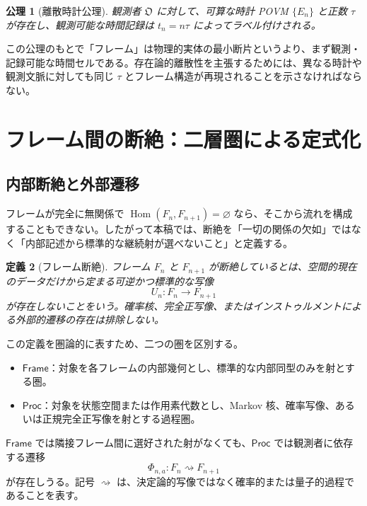 \documentclass[a4paper,11pt]{ltjsarticle}
\newtheorem{definition}{定義}[section]
\newtheorem{axiom}[definition]{公理}
\theoremstyle{remark}
\newcommand{\Hom}{\operatorname{Hom}}
\newcommand{\Frame}{\mathsf{Frame}}
\newcommand{\Proc}{\mathsf{Proc}}
\begin{document}
\begin{axiom}[離散時計公理]
観測者 $\mathfrak O$ に対して、可算な時計 POVM $\{E_n\}$ と正数 $\tau$ が存在し、観測可能な時間記録は $t_n=n\tau$ によってラベル付けされる。
\end{axiom}

この公理のもとで「フレーム」は物理的実体の最小断片というより、まず観測・記録可能な時間セルである。存在論的離散性を主張するためには、異なる時計や観測文脈に対しても同じ $\tau$ とフレーム構造が再現されることを示さなければならない。

\section{フレーム間の断絶：二層圏による定式化}

\subsection{内部断絶と外部遷移}
フレームが完全に無関係で $\Hom(F_n,F_{n+1})=\varnothing$ なら、そこから流れを構成することもできない。したがって本稿では、断絶を「一切の関係の欠如」ではなく「内部記述から標準的な継続射が選べないこと」と定義する。

\begin{definition}[フレーム断絶]
フレーム $F_n$ と $F_{n+1}$ が断絶しているとは、空間的現在のデータだけから定まる可逆かつ標準的な写像
\begin{equation}
 U_n:F_n\longrightarrow F_{n+1}
\end{equation}
が存在しないことをいう。確率核、完全正写像、またはインストゥルメントによる外部的遷移の存在は排除しない。
\end{definition}

この定義を圏論的に表すため、二つの圏を区別する。
\begin{itemize}
  \item $\Frame$：対象を各フレームの内部幾何とし、標準的な内部同型のみを射とする圏。
  \item $\Proc$：対象を状態空間または作用素代数とし、Markov 核、確率写像、あるいは正規完全正写像を射とする過程圏。
\end{itemize}
$\Frame$ では隣接フレーム間に選好された射がなくても、$\Proc$ では観測者に依存する遷移
\begin{equation}
 \Phi_{n,a}:F_n\rightsquigarrow F_{n+1}
 \label{eq:externaltransition}
\end{equation}
が存在しうる。記号 $\rightsquigarrow$ は、決定論的写像ではなく確率的または量子的過程であることを表す。
\end{document}
